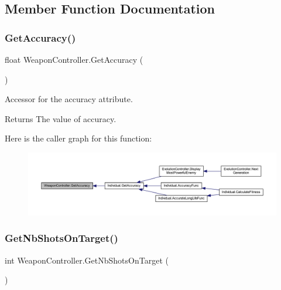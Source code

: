 \subsection{Member Function Documentation}
\mbox{\label{class_weapon_controller_a32d07eb45dc1079a4c82bae18a57f493}} 
\subsubsection{\texorpdfstring{Get\+Accuracy()}{GetAccuracy()}}
{\footnotesize\ttfamily float Weapon\+Controller.\+Get\+Accuracy (\begin{DoxyParamCaption}{ }\end{DoxyParamCaption})}



Accessor for the accuracy attribute. 

\begin{DoxyReturn}{Returns}
The value of accuracy.
\end{DoxyReturn}
Here is the caller graph for this function\+:\nopagebreak
\begin{figure}[H]
\begin{center}
\leavevmode
\includegraphics[width=350pt]{class_weapon_controller_a32d07eb45dc1079a4c82bae18a57f493_icgraph}
\end{center}
\end{figure}
\mbox{\label{class_weapon_controller_aab88ffc7b720e10dce55b93dec090297}} 
\subsubsection{\texorpdfstring{Get\+Nb\+Shots\+On\+Target()}{GetNbShotsOnTarget()}}
{\footnotesize\ttfamily int Weapon\+Controller.\+Get\+Nb\+Shots\+On\+Target (\begin{DoxyParamCaption}{ }\end{DoxyParamCaption})}




